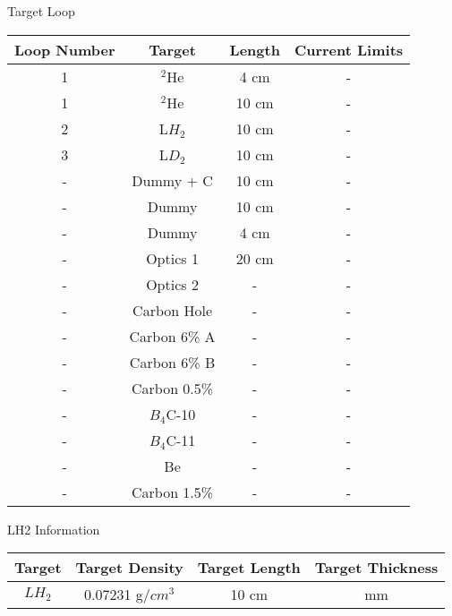 \begin{Mtable}{Target Loop}
  \centering
  \begin{tabular}{|c|c|c|c|}
    \hline
    \textbf{Loop Number} & \textbf{Target} & \textbf{Length} & \textbf{Current Limits} \\
    \hline
    1 & $^{2}\mathrm{He}$ & 4 cm & - \\
    1 & $^{2}\mathrm{He}$ & 10 cm & - \\
    2 & L$H_2$ & 10 cm & - \\
    3 & L$D_2$ & 10 cm & - \\
    - & Dummy + C & 10 cm & - \\
    - & Dummy & 10 cm  & - \\
    - & Dummy & 4 cm  & - \\
    - & Optics 1 & 20 cm  & - \\
    - & Optics 2 & -  & - \\
    - & Carbon Hole & -  & - \\
    - & Carbon 6\% A & -  & - \\
    - & Carbon 6\% B & -  & - \\
    - & Carbon 0.5\% & -  & - \\
    - & $B_4$C-10 & -  & - \\
    - & $B_4$C-11 & -  & - \\
    - & Be & -  & - \\
    - & Carbon 1.5\% & -  & - \\
    \hline
    \end{tabular}
  \caption{Break down of all targets available during the running period. The three cryogenic targets are labeled alongside their corresponding loops. The target length is also provided for each type.}
  \label{tab:2-3_target_loop}
\end{Mtable}

\begin{Mtable}{LH2 Information}
  \centering
  \begin{tabular}{|c|c|c|c|}
    \hline
    \textbf{Target} & \textbf{Target Density} & \textbf{Target Length} & \textbf{Target Thickness} \\
    \hline
    $LH_2$ & 0.07231 g/$cm^3$ & 10 cm & mm \\
    \hline
    \end{tabular}
  \label{tab:2-3_lh2_properties}
\end{Mtable}

%
%

